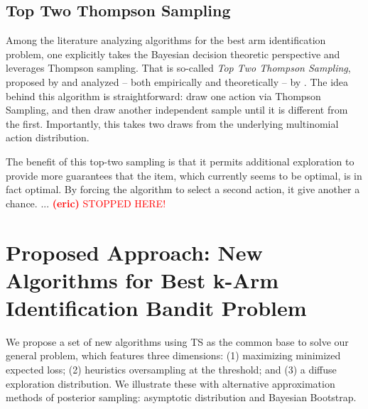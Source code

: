 \documentclass[nonblindrev]{informs3}
\newcommand{\eric}[1]{\textcolor{red}{\textbf{(eric)} #1}}
\begin{document}
\subsection{Top Two Thompson Sampling}

Among the literature analyzing algorithms for the best arm identification problem, one explicitly takes the Bayesian decision theoretic perspective and leverages Thompson sampling. That is so-called \emph{Top Two Thompson Sampling}, proposed by and analyzed -- both empirically and theoretically -- by \cite{russo2018simple}. The idea behind this algorithm is straightforward: draw one action via Thompson Sampling, and then draw another independent sample until it is different from the first. Importantly, this takes two draws from the underlying multinomial action distribution. 

The benefit of this top-two sampling is that it permits additional exploration to provide more guarantees that the item, which currently seems to be optimal, is in fact optimal. By forcing the algorithm to select a second action, it give another a chance. ... \eric{STOPPED HERE!}


\section{Proposed Approach: New Algorithms for Best k-Arm Identification Bandit Problem} 

We propose a set of new algorithms using TS as the common base to solve our general problem, which features three dimensions: (1) maximizing minimized expected loss; (2) heuristics oversampling at the threshold; and (3) a diffuse exploration distribution. We illustrate these with alternative approximation methods of posterior sampling: asymptotic distribution and Bayesian Bootstrap.
\end{document}
